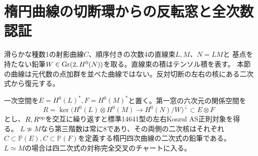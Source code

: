 \section{楕円曲線の切断環からの反転窓と全次数認証}
\label{sec:elliptic-reversible-pencil}
滑らかな種数1の射影曲線$C$、順序付きの次数4の直線束$L,M$、$N=LM$と
基点を持たない鉛筆$W\in\operatorname{Gr}(2,H^0(N))$を取る。直線束の積はテンソル積を表す。
本節の曲線は元代数の点加群を並べた曲線ではない。反対切断の左右の核にある二次式から復元する。

\begin{theorem}[楕円鉛筆の全ファイバーの正則性]\label{thm:elliptic-pencil-all-as}
一次空間を$E=H^0(L)^*,F=H^0(M)^*$と置く。第一窓の六次元の関係空間を
\[
 R=\ker\bigl(H^0(L)\otimes H^0(M)\longrightarrow H^0(N)/W\bigr)^\perp
 \subset E\otimes F
\]
とし、$R,R^{\rm op}$を交互に繰り返すと標準14641型の左右Koszul AS正則対象を得る。
$L\not\simeq M$なら第三階数は常に8であり、その両側の二次核はそれぞれ
$C\subset\mathbb P(E), C\subset\mathbb P(F)$を定義する楕円四次曲線の二次式の鉛筆である。
$L\simeq M$の場合は四二次式の対称完全交叉のチャートに入る。
\end{theorem}
